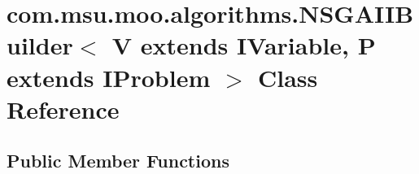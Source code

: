 \hypertarget{classcom_1_1msu_1_1moo_1_1algorithms_1_1NSGAIIBuilder_3_01V_01extends_01IVariable_00_01P_01extends_01IProblem_01_4}{\section{com.\-msu.\-moo.\-algorithms.\-N\-S\-G\-A\-I\-I\-Builder$<$ V extends I\-Variable, P extends I\-Problem $>$ Class Reference}
\label{classcom_1_1msu_1_1moo_1_1algorithms_1_1NSGAIIBuilder_3_01V_01extends_01IVariable_00_01P_01extends_01IProblem_01_4}
}
\subsection*{Public Member Functions}
